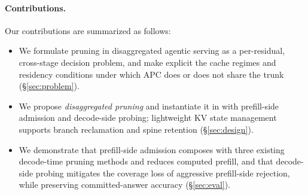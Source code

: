 \paragraph{Contributions.}
Our contributions are summarized as follows:
\begin{itemize}[leftmargin=*,itemsep=1pt,topsep=2pt]
\item We formulate pruning in disaggregated agentic serving as a per-residual, cross-stage decision problem, and make explicit the cache regimes and residency conditions under which APC does or does not share the trunk (\S\ref{sec:problem}).
\item We propose \emph{disaggregated pruning} and instantiate it in \sys{} with prefill-side admission and decode-side probing; lightweight KV state management supports branch reclamation and spine retention (\S\ref{sec:design}).
\item We demonstrate that prefill-side admission composes with three existing decode-time pruning methods and reduces computed prefill, and that decode-side probing mitigates the coverage loss of aggressive prefill-side rejection, while preserving committed-answer accuracy (\S\ref{sec:eval}).
\end{itemize}
